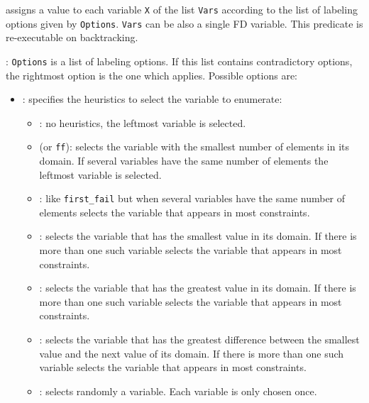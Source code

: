 \Description

 assigns a value to each variable
\texttt{X} of the list \texttt{Vars} according to the list of labeling
options given by \texttt{Options}. \texttt{Vars} can be also a single FD
variable. This predicate is re-executable on backtracking.

: \texttt{Options} is a list of labeling
options. If this list contains contradictory options, the rightmost option
is the one which applies. Possible options are:

\begin{itemize}

\item {}: specifies the
heuristics to select the variable to enumerate:

\begin{itemize}

\item {}: no heuristics, the leftmost variable is selected.

\item {} (or \texttt{ff}): selects the variable with the
smallest number of elements in its domain. If several variables have the
same number of elements the leftmost variable is selected.

\item {}: like \texttt{first\_fail} but when
several variables have the same number of elements selects the
variable that appears in most constraints.

\item {}: selects the variable that has the smallest value
in its domain. If there is more than one such variable selects the
variable that appears in most constraints.

\item {}: selects the variable that has the greatest value in
its domain. If there is more than one such variable selects the variable
that appears in most constraints.

\item {}: selects the variable that has the greatest
difference between the smallest value and the next value of its domain. If
there is more than one such variable selects the variable that appears in
most constraints.

\item {}: selects randomly a variable. Each variable is only
chosen once.


\end{itemize}
\end{itemize}
